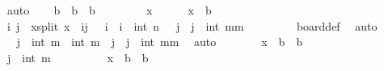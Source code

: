 \begin{isabellebody}
\ auto\isanewline
{}\isamarkupfalse%
\isanewline
\ \ \isamarkupfalse%
\ {\isachardoublequoteopen}{\isacharquery}{\kern0pt}b\ {\isasymsubseteq}\ {\isacharquery}{\kern0pt}b{}\ {\isasymunion}\ {\isacharquery}{\kern0pt}b{}{\isachardoublequoteclose}\isanewline
\ \ \isamarkupfalse%
\isanewline
\ \ \ \ \isamarkupfalse%
\ x\isanewline
\ \ \ \ \isamarkupfalse%
\ {\isachardoublequoteopen}x\ {\isasymin}\ {\isacharquery}{\kern0pt}b{\isachardoublequoteclose}\isanewline
\ \ \ \ \isamarkupfalse%
\ \isamarkupfalse%
\ i\ j\ \ x{\isacharunderscore}{\kern0pt}split{\isacharcolon}{\kern0pt}\ {\isachardoublequoteopen}x\ {\isacharequal}{\kern0pt}\ {\isacharparenleft}{\kern0pt}i{\isacharcomma}{\kern0pt}j{\isacharparenright}{\kern0pt}{\isachardoublequoteclose}\ {\isachardoublequoteopen}{}\ {\isasymle}\ i\ {\isasymand}\ i\ {\isasymle}\ int\ n{\isachardoublequoteclose}\ {\isachardoublequoteopen}{}\ {\isasymle}\ j\ {\isasymand}\ j\ {\isasymle}\ int\ {\isacharparenleft}{\kern0pt}mm\ \isanewline
\ \ \ \ \ \ \isamarkupfalse%
\ board{\isacharunderscore}{\kern0pt}def\ \isamarkupfalse%
\ auto\isanewline
\ \ \ \ \isamarkupfalse%
\ \isamarkupfalse%
\ {\isachardoublequoteopen}j\ {\isasymle}\ int\ m\ {\isasymor}\ {\isacharparenleft}{\kern0pt}int\ m\ {\isacharless}{\kern0pt}\ j\ {\isasymand}\ j\ {\isasymle}\ int\ {\isacharparenleft}{\kern0pt}mm\ \isamarkupfalse%
\ auto\isanewline
\ \ \ \ \isamarkupfalse%
\ \isamarkupfalse%
\ {\isachardoublequoteopen}x\ {\isasymin}\ {\isacharquery}{\kern0pt}b{}\ {\isasymunion}\ {\isacharquery}{\kern0pt}b{}{\isachardoublequoteclose}\isanewline
\ \ \ \ \isamarkupfalse%
\isanewline
\ \ \ \ \ \ \isamarkupfalse%
\ {\isachardoublequoteopen}j\ {\isasymle}\ int\ m\isanewline
\ \ \ \ \ \ \isamarkupfalse%
\ \isamarkupfalse%
\ {\isachardoublequoteopen}x\ {\isasymin}\ {\isacharquery}{\kern0pt}b{}\ {\isasymunion}\ {\isacharquery}{\kern0pt}b{}{\isachardoublequoteclose}\ \isamarkupfalse%

\end{isabellebody}
